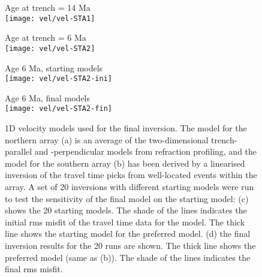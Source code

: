 \documentclass[reviewcopy]{elsarticle}
\renewcommand{\includegraphics}[2][]{\fbox{#2}}
\begin{document}
\begin{figure}
\begin{minipage}[t]{0.49\textwidth}
{ Age at trench = 14 Ma} \\
\texttt{[image: vel/vel-STA1]}
\end{minipage}\hfill%
\begin{minipage}[t]{0.49\textwidth}
{  Age at trench = 6 Ma} \\
\texttt{[image: vel/vel-STA2]}
\end{minipage}
\vspace{1.5\baselineskip}

\begin{minipage}[t]{0.49\textwidth}
{ Age 6 Ma, starting models} \\
\texttt{[image: vel/vel-STA2-ini]}
\end{minipage}\hfill%
\begin{minipage}[t]{0.49\textwidth}
{ Age 6 Ma, final models} \\
\texttt{[image: vel/vel-STA2-fin]}
\end{minipage}

\caption{1D velocity models used for the final inversion.  The model
  for the northern array (a) is an average of the two-dimensional
  trench-parallel and -perpendicular models from refraction profiling,
and the model for the southern array (b) has been derived by a linearised
inversion of the travel time picks from well-located events within the
array.  A set of 20 inversions with different starting models were run
to test the sensitivity of the final model on the starting model: (c)
shows the 20 starting models. The shade of the lines indicates the
initial rms
misfit of the travel time data for the model.  The thick line shows the starting
model for the preferred model.
 (d) the final inversion results for the 20 runs are
shown.  The thick line shows the preferred model (same as (b)). The shade of the lines indicates the
final rms misfit.
}
\label{figa:velocity}
\end{figure}


\end{document}
